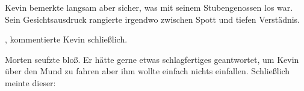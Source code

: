 \par

Kevin bemerkte langsam aber sicher, was mit seinem Stubengenossen los war. Sein Gesichtsausdruck rangierte irgendwo zwischen Spott und tiefen Verstädnis.

\par

, kommentierte Kevin schließlich. 

\par

Morten seufzte bloß. Er hätte gerne etwas schlagfertiges geantwortet, um Kevin über den Mund zu fahren aber ihm wollte einfach nichts einfallen. Schließlich meinte dieser: 
